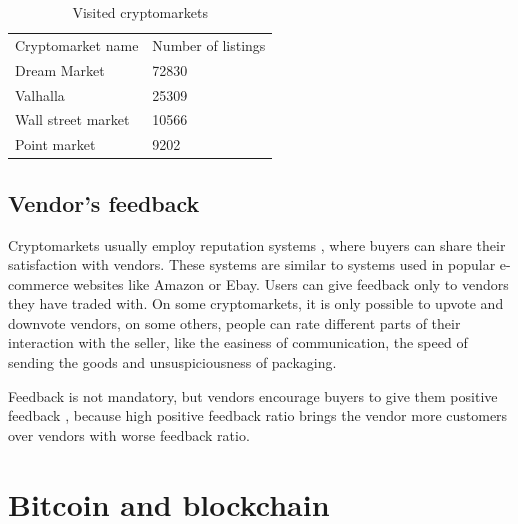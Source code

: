 \documentclass[
  digital, %
  table,   %
  lof,     %
  lot,     %
  oneside
]{fithesis3}
\begin{document}
\begin{table}
    \caption{Visited cryptomarkets}
    \label{cryptomarkets}
    \begin{tabular}{|l|l|}
    Cryptomarket name & Number of listings\\
    Dream Market & 72830 \\
    Valhalla     & 25309 \\
    Wall street market   & 10566 \\
    Point market  & 9202 \\
    \end{tabular}
\end{table}

\subsection{Vendor's feedback}

Cryptomarkets usually employ reputation systems \cite{resnick2000reputation},
where buyers can share their satisfaction with vendors.
These systems are similar to systems used in popular e-commerce websites like Amazon or Ebay.
Users can give feedback only to vendors they have traded with.
On some cryptomarkets, it is only possible to upvote and downvote vendors,
on some others, people can rate different parts of their interaction with the seller,
like the easiness of communication,
the speed of sending the goods and unsuspiciousness of packaging.

Feedback is not mandatory, but vendors encourage buyers to give them positive feedback
\cite{aldridge2014not}\cite{soska2015measuring}, because high positive feedback
ratio brings the vendor more customers over vendors with worse feedback ratio.

\section{Bitcoin and blockchain}
\end{document}
